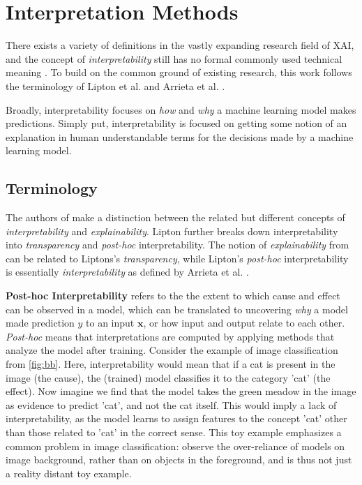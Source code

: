 \documentclass[sigconf]{acmart}
\newcommand{\mypar}[1]{\vspace{0.2cm}\noindent\textbf{#1}}
\begin{document}
% 
\section{Interpretation Methods}
\label{sec:interpretation_methods}

There exists a variety of definitions in the vastly expanding research field of XAI, and the concept of \textit{interpretability} still has no formal commonly used technical meaning \cite{lipton2018mythos}. To build on the common ground of existing research, this work follows the terminology of Lipton et al. \cite{lipton2018mythos} and Arrieta et al. \cite{arrieta2020explainable}.

Broadly, interpretability focuses on \textit{how} and \textit{why} a machine learning model makes predictions.
Simply put, interpretability is focused on getting some notion of an explanation in human understandable terms for the decisions made by a machine learning model.

\subsection{Terminology}
\label{subsec:interpretation_methods_terminology}
The authors of \cite{arrieta2020explainable} make a distinction between the related but different concepts of \textit{interpretability} and \textit{explainability}. Lipton \cite{lipton2018mythos} further breaks down interpretability into \textit{transparency} and \textit{post-hoc} interpretability. The notion of \textit{explainability} from \cite{arrieta2020explainable} can be related to Liptons's \textit{transparency}, while Lipton's \textit{post-hoc} interpretability is essentially \textit{interpretability} as defined by Arrieta et al. \cite{arrieta2020explainable}.

\mypar{Post-hoc Interpretability} refers to the the extent to which cause and effect can be observed in a model, which can be translated to uncovering \textit{why} a model made prediction $y$ to an input $\mathbf{x}$, or how input and output relate to each other. \textit{Post-hoc} means that interpretations are computed by applying methods that analyze the model after training. Consider the example of image classification from \autoref{fig:bb}. Here, interpretability would mean that if a cat is present in the image (the cause), the (trained) model classifies it to the category 'cat' (the effect). Now imagine we find that the model takes the green meadow in the image as evidence to predict 'cat', and not the cat itself. This would imply a lack of interpretability, as the model learns to assign features to the concept 'cat' other than those related to 'cat' in the correct sense. This toy example emphasizes a common problem in image classification: \cite{xiao2020noise} observe the over-reliance of models on image background, rather than on objects in the foreground, and is thus not just a reality distant toy example.
\end{document}
